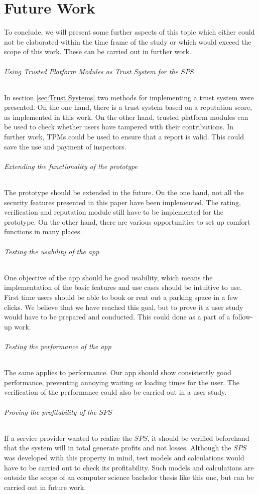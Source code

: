 \chapter{Future Work}
\label{ch:Future Work}
To conclude, we will present some further aspects of this topic which either could not be elaborated within the time frame of the study or which would exceed the scope of this work. These can be carried out in further work.

\subparagraph{Using Trusted Platform Modules as Trust System for the $SPS$}
In section \ref{sec:Trust Systems} two methods for implementing a trust system were presented. On the one hand, there is a trust system based on a reputation score, as implemented in this work. On the other hand, trusted platform modules can be used to check whether users have tampered with their contributions. In further work, TPMs could be used to ensure that a report is valid. This could save the use and payment of inspectors.
\subparagraph{Extending the functionality of the prototype}
The prototype should be extended in the future. On the one hand, not all the security features presented in this paper have been implemented.  The rating, verification and reputation module still have to be implemented for the prototype. On the other hand, there are various opportunities to set up comfort functions in many places.
\subparagraph{Testing the usability of the app}
One objective of the app should be good usability, which means the implementation of the basic features and use cases should be intuitive to use. First time users should be able to book or rent out a parking space in a few clicks. We believe that we have reached this goal, but to prove it a user study would have to be prepared and conducted. This could done as a part of a follow-up work.
\subparagraph{Testing the performance of the app}
The same applies to performance. Our app should show consistently good performance, preventing annoying waiting or loading times for the user. The verification of the performance could also be carried out in a user study.
\subparagraph{Proving the profitability of the $SPS$}
If a service provider wanted to realize the $SPS$, it should be verified beforehand that the system will in total generate profits and not losses. Although the $SPS$ was developed with this property in mind, test models and calculations would have to be carried out to check its profitability. Such models and calculations are outside the scope of an computer science bachelor thesis like this one, but can be carried out in future work.
